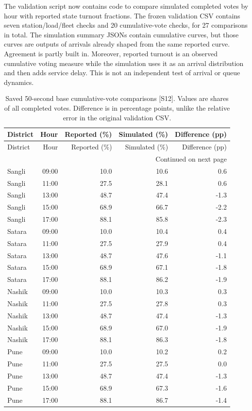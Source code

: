 \documentclass[11pt,a4paper,oneside]{report}
\newcommand{\source}[1]{\par\nopagebreak[4]{\footnotesize\color{teal}Evidence: #1.}\par}
\begin{document}
The validation script now contains code to compare simulated completed votes by hour with reported state turnout fractions. The frozen validation CSV contains seven station/load/fleet checks and 20 cumulative-vote checks, for 27 comparisons in total. The simulation summary JSONs contain cumulative curves, but those curves are outputs of arrivals already shaped from the same reported curve. Agreement is partly built in. Moreover, reported turnout is an observed cumulative voting measure while the simulation uses it as an arrival distribution and then adds service delay. This is not an independent test of arrival or queue dynamics.
\source{[S11], [S12]}
\begin{center}
\small
\setlength{\tabcolsep}{5pt}
\begin{longtable}{lrrrr}
\caption{Saved 50-second base cumulative-vote comparisons [S12]. Values are shares of all completed votes. Difference is in percentage points, unlike the relative error in the original validation CSV.}\\
\toprule
District & Hour & Reported (\%) & Simulated (\%) & Difference (pp)\\
\midrule\endfirsthead
\toprule
District & Hour & Reported (\%) & Simulated (\%) & Difference (pp)\\
\midrule\endhead
\midrule\multicolumn{5}{r}{\footnotesize Continued on next page}\\\endfoot
\bottomrule\endlastfoot
Sangli & 09:00 & 10.0 & 10.6 & 0.6\\
Sangli & 11:00 & 27.5 & 28.1 & 0.6\\
Sangli & 13:00 & 48.7 & 47.4 & -1.3\\
Sangli & 15:00 & 68.9 & 66.7 & -2.2\\
Sangli & 17:00 & 88.1 & 85.8 & -2.3\\
Satara & 09:00 & 10.0 & 10.4 & 0.4\\
Satara & 11:00 & 27.5 & 27.9 & 0.4\\
Satara & 13:00 & 48.7 & 47.6 & -1.1\\
Satara & 15:00 & 68.9 & 67.1 & -1.8\\
Satara & 17:00 & 88.1 & 86.2 & -1.9\\
Nashik & 09:00 & 10.0 & 10.3 & 0.3\\
Nashik & 11:00 & 27.5 & 27.8 & 0.3\\
Nashik & 13:00 & 48.7 & 47.4 & -1.3\\
Nashik & 15:00 & 68.9 & 67.0 & -1.9\\
Nashik & 17:00 & 88.1 & 86.3 & -1.8\\
Pune & 09:00 & 10.0 & 10.2 & 0.2\\
Pune & 11:00 & 27.5 & 27.5 & 0.0\\
Pune & 13:00 & 48.7 & 47.4 & -1.3\\
Pune & 15:00 & 68.9 & 67.3 & -1.6\\
Pune & 17:00 & 88.1 & 86.7 & -1.4\\
\end{longtable}
\end{center}
\end{document}
